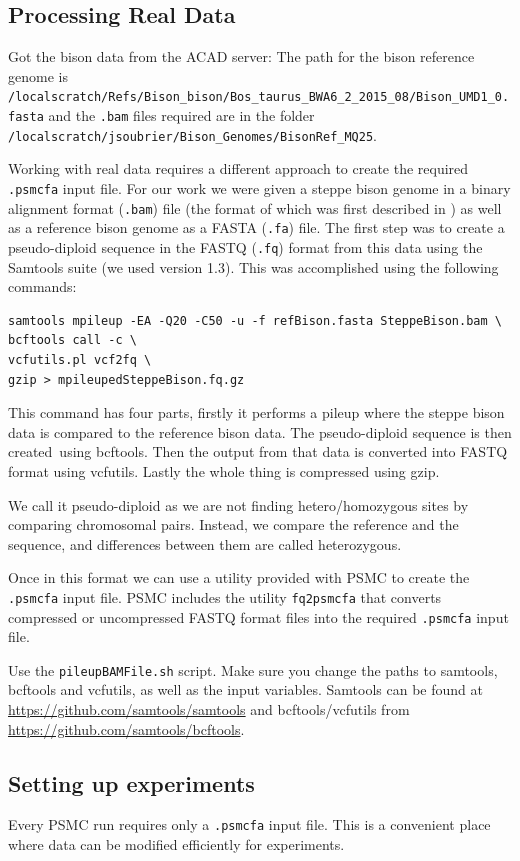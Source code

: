 \documentclass[11pt,a4paper]{article}
\begin{document}
\subsection{Processing Real Data}
Got the bison data from the ACAD server: The path for the bison reference genome is \verb|/localscratch/Refs/Bison_bison/Bos_taurus_BWA6_2_2015_08/Bison_UMD1_0.fasta| and the \verb|.bam| files required are in the folder \verb|/localscratch/jsoubrier/Bison_Genomes/BisonRef_MQ25|.

Working with real data requires a different approach to create the required \verb|.psmcfa| input file. For our work we were given a steppe bison genome in a binary alignment format (\verb|.bam|) file (the format of which was first described in \cite{li2009sequence}) as well as a reference bison genome as a FASTA (\verb|.fa|) file. The first step was to create a pseudo-diploid sequence in the FASTQ (\verb|.fq|) format from this data using the Samtools suite (we used version 1.3). This was accomplished using the following commands:
\begin{verbatim}
samtools mpileup -EA -Q20 -C50 -u -f refBison.fasta SteppeBison.bam \ 
bcftools call -c \
vcfutils.pl vcf2fq \
gzip > mpileupedSteppeBison.fq.gz
\end{verbatim}
This command has four parts, firstly it performs a pileup where the steppe bison data is compared to the reference bison data. The pseudo-diploid sequence is then created\ using bcftools.  Then the output from that data is converted into FASTQ format using vcfutils. Lastly the whole thing is compressed using gzip. 

We call it pseudo-diploid as we are not finding hetero/homozygous sites by comparing chromosomal pairs. Instead, we compare the reference and the sequence, and differences between them are called heterozygous.

Once in this format we can use a utility provided with PSMC to create the \verb|.psmcfa| input file. PSMC includes the utility \verb|fq2psmcfa| that converts compressed or uncompressed FASTQ format files into the required \verb|.psmcfa| input file.

Use the \verb|pileupBAMFile.sh| script. Make sure you change the paths to samtools, bcftools and vcfutils, as well as the input variables. Samtools can be found at \url{https://github.com/samtools/samtools} and bcftools/vcfutils from \url{https://github.com/samtools/bcftools}.

\subsection{Setting up experiments} %
Every PSMC run requires only a \verb|.psmcfa| input file. This is a convenient place where data can be modified efficiently for experiments.
\end{document}
